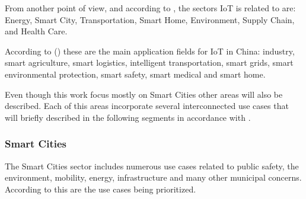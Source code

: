 From another point of view, and according to \cite{7073822}, the sectors \gls{IoT} is related to are: Energy, Smart City, Transportation, Smart Home, Environment, Supply Chain, and Health Care.

According to (\cite{6851114}) these are the main application fields for \gls{IoT} in China: industry, smart agriculture, smart logistics, intelligent transportation, smart grids, smart environmental protection, smart safety, smart medical and smart home.

Even though this work focus mostly on Smart Cities other areas will also be described. Each of this areas incorporate several interconnected use cases that will briefly described in the following segments in accordance with \cite{nivzetic2019smart}.

\subsubsection{Smart Cities}
\label{subsubsec:stateofart:iot:areas:cities}

The Smart Cities sector includes numerous use cases related to public safety, the environment, mobility, energy, infrastructure and many other municipal concerns. According to \cite{iot-smart-city-prioritized} this are the use cases being prioritized.


